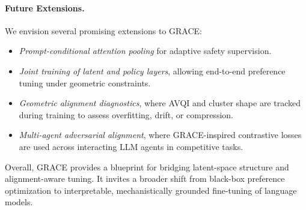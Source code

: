 \paragraph{Future Extensions.}
We envision several promising extensions to GRACE:
\begin{itemize}
    \item \textit{Prompt-conditional attention pooling} for adaptive safety supervision.
    \item \textit{Joint training of latent and policy layers}, allowing end-to-end preference tuning under geometric constraints.
    \item \textit{Geometric alignment diagnostics}, where AVQI and cluster shape are tracked during training to assess overfitting, drift, or compression.
    \item \textit{Multi-agent adversarial alignment}, where GRACE-inspired contrastive losses are used across interacting LLM agents in competitive tasks.
\end{itemize}



\vspace{1mm}
\noindent Overall, GRACE provides a blueprint for bridging latent-space structure and alignment-aware tuning. It invites a broader shift from black-box preference optimization to interpretable, mechanistically grounded fine-tuning of language models.
